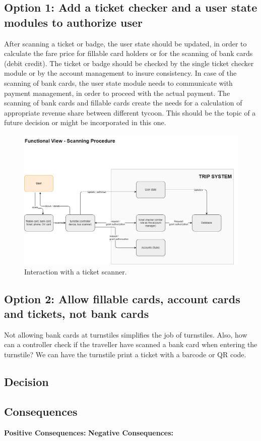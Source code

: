 \subsection*{Option 1: Add a ticket checker and a user state modules to authorize user}
After scanning a ticket or badge, the user state should be updated, in order to calculate the fare price for fillable card holders or for the scanning of bank cards (debit credit).
The ticket or badge should be checked by the single ticket checker module or by the account management to insure consistency.
In case of the scanning of bank cards, the user state module needs to communicate with payment management, in order to proceed with the actual payment.
The scanning of bank cards and fillable cards create the needs for a calculation of appropriate revenue share between different tycoon. This should be the topic of a future decision or might be incorporated in this one.
\begin{figure}[ht]
    \centering
    \includegraphics[width=\textwidth]{drawings/views_draft2/functional_view turnstiles.png}
    \caption{Interaction with a ticket scanner.}
    \label{fig:ticket_scanner}
\end{figure}

\subsection*{Option 2: Allow fillable cards, account cards and tickets, not bank cards}
Not allowing bank cards at turnstiles simplifies the job of turnstiles.
Also, how can a controller check if the traveller have scanned a bank card when entering the turnstile?
We can have the turnstile print a ticket with a barcode or QR code.

\subsection*{Decision}

\subsection*{Consequences}
\textbf{Positive Consequences:}
\textbf{Negative Consequences:}
